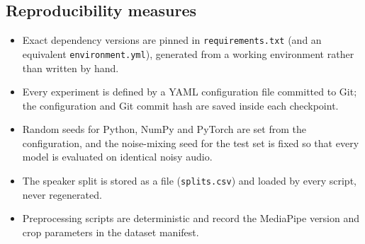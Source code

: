 \subsection{Reproducibility measures}
\begin{itemize}
  \item Exact dependency versions are pinned in \texttt{requirements.txt} (and an
        equivalent \texttt{environment.yml}), generated from a working
        environment rather than written by hand.
  \item Every experiment is defined by a YAML configuration file committed to
        Git; the configuration and Git commit hash are saved inside each
        checkpoint.
  \item Random seeds for Python, NumPy and PyTorch are set from the
        configuration, and the noise-mixing seed for the test set is fixed so
        that every model is evaluated on identical noisy audio.
  \item The speaker split is stored as a file (\texttt{splits.csv}) and loaded by
        every script, never regenerated.
  \item Preprocessing scripts are deterministic and record the MediaPipe
        version and crop parameters in the dataset manifest.
\end{itemize}
